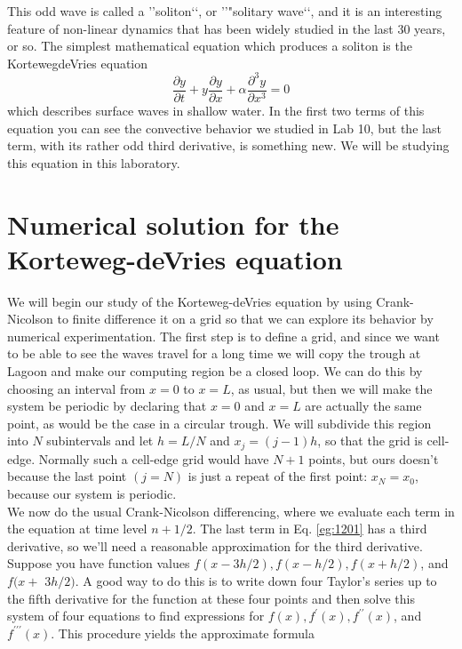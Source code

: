 \documentclass{book}
\theoremstyle{plain}
\theoremstyle{definition}
\numberwithin{exm}{chapter}
\theoremstyle{remark}
\theoremstyle{summary}
\theoremstyle{overview}
\begin{document}
This odd wave is called a \rq\rq soliton\lq\lq, or \rq\rq "solitary wave\lq\lq, and it is an interesting feature of non-linear dynamics that has been widely studied in the last 30 years, or so. The simplest mathematical equation which produces a soliton is the KortewegdeVries equation
\begin{equation}\label{eq:1201}
\frac{\partial y}{\partial t}+y \frac{\partial y}{\partial x}+\alpha \frac{\partial^{3} y}{\partial x^{3}}=0
\end{equation}
which describes surface waves in shallow water. In the first two terms of this
equation you can see the convective behavior we studied in Lab 10, but the last
term, with its rather odd third derivative, is something new. We will be studying
this equation in this laboratory.

\section*{Numerical solution for the Korteweg-deVries equation}
We will begin our study of the Korteweg-deVries equation by using Crank-Nicolson to finite difference it on a grid so that we can explore its behavior by numerical experimentation. The first step is to define a grid, and since we want to be able to see the waves travel for a long time we will copy the trough at Lagoon and make our computing region be a closed loop. We can do this by choosing an interval from $x=0$ to $x=L$, as usual, but then we will make the system be periodic by declaring that $x=0$ and $x=L$ are actually the same point, as would be the case in a circular trough. We will subdivide this region into $N$ subintervals and let $h=L / N$ and $x_{j}=(j-1) h$, so that the grid is cell-edge. Normally such a cell-edge grid would have $N+1$ points, but ours doesn't because the last point $(j=N)$ is just a repeat of the first point: $x_{N}=x_{0}$, because our system is periodic.\\
We now do the usual Crank-Nicolson differencing, where we evaluate each term in the equation at time level $n+1 / 2$. The last term in Eq. \eqref{eg:1201} has a third derivative, so we\rq ll need a reasonable approximation for the third derivative. Suppose you have function values $f(x-3 h / 2), f(x-h / 2), f(x+h / 2)$, and $f(x+$ $3 h / 2)$. A good way to do this is to write down four Taylor's series up to the fifth derivative for the function at these four points and then solve this system of four equations to find expressions for $f(x), f^{\prime}(x), f^{\prime \prime}(x)$, and $f^{\prime \prime \prime}(x)$. This procedure yields the approximate formula
\end{document}
